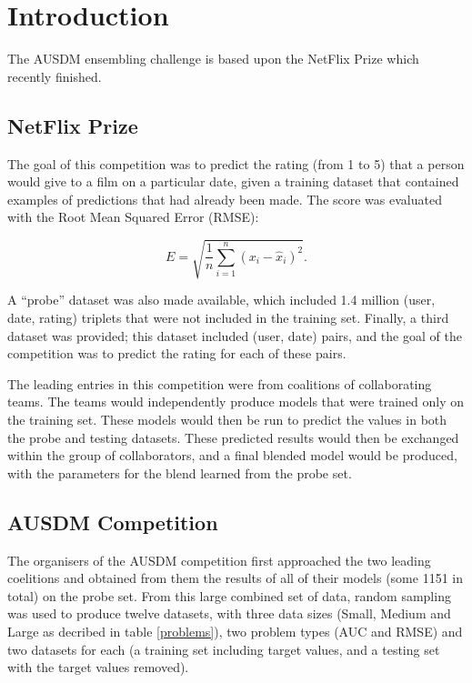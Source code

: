 \documentclass{article}
\begin{document}
\section{Introduction}

The AUSDM ensembling challenge is based upon the NetFlix Prize \cite{NetFlixPrize} which recently finished.

\subsection{NetFlix Prize}

 The goal of this competition was to predict the rating (from 1 to 5) that a person would give to a film on a particular date, given a training dataset that contained examples of predictions that had already been made.  The score was evaluated with the Root Mean Squared Error (RMSE):

$$
E = \sqrt{\frac{1}{n} \sum_{i=1}^{n} (x_i - \hat{x}_i)^2} \label{RMSE}.
$$

A ``probe'' dataset was also made available, which included 1.4 million (user, date, rating) triplets that were not included in the training set.  Finally, a third dataset was provided; this dataset included (user, date) pairs, and the goal of the competition was to predict the rating for each of these pairs.

The leading entries in this competition were from coalitions of collaborating teams.  The teams would independently produce models that were trained only on the training set.  These models would then be run to predict the values in both the probe and testing datasets.  These predicted results would then be exchanged within the group of collaborators, and a final blended model would be produced, with the parameters for the blend learned from the probe set.

\subsection{AUSDM Competition}

The organisers of the AUSDM competition first approached the two leading coelitions and obtained from them the results of all of their models (some 1151 in total) on the probe set.  From this large combined set of data, random sampling was used to produce twelve datasets, with three data sizes (Small, Medium and Large as decribed in table \ref{problems}), two problem types (AUC and RMSE) and two datasets for each (a training set including target values, and a testing set with the target values removed).
\end{document}
